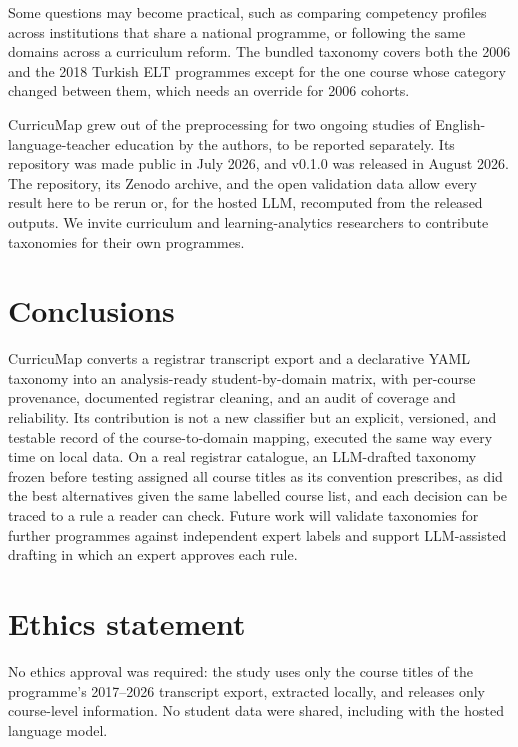 \documentclass[preprint,12pt,a4paper]{elsarticle}
\begin{document}
Some questions may become practical, such as comparing competency profiles across institutions that share a national programme, or following the same domains across a curriculum reform. The bundled taxonomy covers both the 2006 and the 2018 Turkish ELT programmes except for the one course whose category changed between them, which needs an override for 2006 cohorts.

CurricuMap grew out of the preprocessing for two ongoing studies of English-language-teacher education by the authors, to be reported separately. Its repository was made public in July 2026, and v0.1.0 was released in August 2026. The repository, its Zenodo archive, and the open validation data allow every result here to be rerun or, for the hosted LLM, recomputed from the released outputs. We invite curriculum and learning-analytics researchers to contribute taxonomies for their own programmes.

\section{Conclusions}
\label{sec:conclusions}

CurricuMap converts a registrar transcript export and a declarative YAML taxonomy into an analysis-ready student-by-domain matrix, with per-course provenance, documented registrar cleaning, and an audit of coverage and reliability. Its contribution is not a new classifier but an explicit, versioned, and testable record of the course-to-domain mapping, executed the same way every time on local data. On a real registrar catalogue, an LLM-drafted taxonomy frozen before testing assigned all \vTwoCorrect{} course titles as its convention prescribes, as did the best alternatives given the same labelled course list, and each decision can be traced to a rule a reader can check. Future work will validate taxonomies for further programmes against independent expert labels and support LLM-assisted drafting in which an expert approves each rule.

\section*{Ethics statement}
No ethics approval was required: the study uses only the course titles of the programme's 2017--2026 transcript export, extracted locally, and releases only course-level information. No student data were shared, including with the hosted language model.
\end{document}
